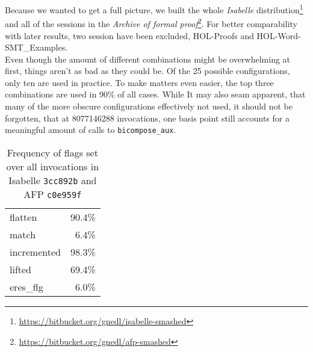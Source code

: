 Because we wanted to get a full picture, we built the whole \textit{Isabelle} distribution\footnote{\url{https://bitbucket.org/gnedl/isabelle-smashed}} and all of the sessions in the \textit{Archive of formal proof}\footnote{\url{https://bitbucket.org/gnedl/afp-smashed}}. For better comparability with later results, two session have been excluded, HOL-Proofs and HOL-Word-SMT\_Examples.\\
Even though the amount of different combinations might be overwhelming at first, things aren't as bad as they could be. Of the 25 possible configurations, only ten are used in practice. To make matters even easier, the top three combinations are used in 90\% of all cases. While It may also seam apparent, that many of the more obscure configurations effectively not used, it should not be forgotten, that at 8077146288 invocations, one basis point still accounts for a meaningful amount of calls to \texttt{bicompose\_aux}.

\begin{table}[ht]
\caption{Frequency of flags set over all invocations in Isabelle \texttt{3cc892b} and AFP \texttt{c0e959f}}
\begin{tabular}{l r}
flatten & 90.4\%\\
match & 6.4\%\\
incremented & 98.3\%\\
lifted & 69.4\%\\
eres\_flg & 6.0\%
\end{tabular}
\label{tab:flag_freq}
\centering
\end{table}

